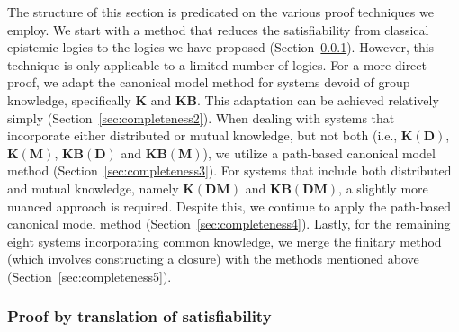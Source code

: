 \documentclass{article}
\newcommand{\K}{\ensuremath{\mathbf{K}}\xspace}
\newcommand{\KD}{\ensuremath{\mathbf{K(D)}}\xspace}
\newcommand{\KDM}{\ensuremath{\mathbf{K(DM)}}\xspace}
\newcommand{\KM}{\ensuremath{\mathbf{K(M)}}\xspace}
\newcommand{\KB}{\ensuremath{\mathbf{KB}}\xspace}
\newcommand{\KBD}{\ensuremath{\mathbf{KB(D)}}\xspace}
\newcommand{\KBDM}{\ensuremath{\mathbf{KB(DM)}}\xspace}
\newcommand{\KBM}{\ensuremath{\mathbf{KB(M)}}\xspace}
\begin{document}
The structure of this section is predicated on the various proof techniques we employ. We start with a method that reduces the satisfiability from classical epistemic logics to the logics we have proposed (Section~\ref{sec:completeness1}). However, this technique is only applicable to a limited number of logics. For a more direct proof, we adapt the canonical model method for systems devoid of group knowledge, specifically \K and \KB. This adaptation can be achieved relatively simply (Section~\ref{sec:completeness2}). When dealing with systems that incorporate either distributed or mutual knowledge, but not both (i.e.,  \KD, \KM, \KBD and \KBM), we utilize a path-based canonical model method (Section~\ref{sec:completeness3}). For systems that include both distributed and mutual knowledge, namely \KDM and \KBDM, a slightly more nuanced approach is required. Despite this, we continue to apply the path-based canonical model method (Section~\ref{sec:completeness4}). Lastly, for the remaining eight systems incorporating common knowledge, we merge the finitary method (which involves constructing a closure) with the methods mentioned above (Section~\ref{sec:completeness5}).

\subsubsection{Proof by translation of satisfiability}
\label{sec:completeness1}
\end{document}
